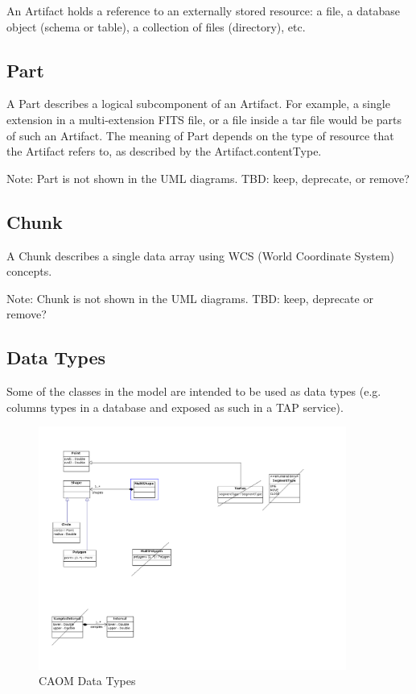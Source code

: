 \documentclass[11pt,a4paper]{ivoa}
\begin{document}
An Artifact holds a reference to an externally stored resource: a file, a
database object (schema or table), a collection of files (directory), etc.

\subsection{Part}

A Part describes a logical subcomponent of an Artifact. For example, a single 
extension in a multi-extension FITS file, or a file inside a tar file would be parts
of such an Artifact. The meaning of Part depends on the type of resource that the
Artifact refers to, as described by the Artifact.contentType.

Note: Part is not shown in the UML diagrams. TBD: keep, deprecate, or remove?

\subsection{Chunk}

A Chunk describes a single data array using WCS (World Coordinate System) concepts. 

Note: Chunk is not shown in the UML diagrams. TBD: keep, deprecate or remove?

\subsection{Data Types}
Some of the classes in the model are intended to be used as data types (e.g. columns
types in a database and exposed as such in a TAP service).

\begin{figure}
\centering
\includegraphics[width=0.9\textwidth]{src/uml/CAOM2datatypes.png}
\caption{CAOM Data Types}
\label{fig:datatypes}
\end{figure}
\end{document}
